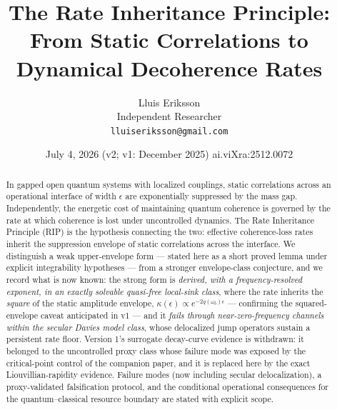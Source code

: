 \documentclass[11pt,a4paper]{article}
\title{The Rate Inheritance Principle:\\
From Static Correlations to Dynamical Decoherence Rates}
\author{Lluis Eriksson\\ \small Independent Researcher\\
\small \texttt{lluiseriksson@gmail.com}}
\date{July 4, 2026 \quad (v2; v1: December 2025) \quad ai.viXra:2512.0072}
\theoremstyle{plain}
\theoremstyle{definition}
\theoremstyle{remark}
\newcommand{\eps}{\epsilon}
\begin{document}
\maketitle

\begin{center}
\end{center}

\begin{abstract}
In gapped open quantum systems with localized couplings, static correlations
across an operational interface of width $\eps$ are exponentially suppressed
by the mass gap. Independently, the energetic cost of maintaining quantum
coherence is governed by the rate at which coherence is lost under
uncontrolled dynamics. The Rate Inheritance Principle (RIP) is the hypothesis
connecting the two: effective coherence-loss rates inherit the suppression
envelope of static correlations across the interface. We distinguish a weak
upper-envelope form --- stated here as a short proved lemma under explicit
integrability hypotheses --- from a stronger envelope-class conjecture, and we
record what is now known: the strong form is \emph{derived, with a
frequency-resolved exponent, in an exactly solvable quasi-free local-sink
class}, where the rate inherits the \emph{square} of the static amplitude
envelope, $\kappa(\eps) \propto e^{-2q(\omega_b)\eps}$ --- confirming the
squared-envelope caveat anticipated in v1 --- and it \emph{fails through
near-zero-frequency channels within the secular Davies model class}, whose
delocalized jump operators sustain a persistent rate floor. Version 1's
surrogate decay-curve evidence is withdrawn: it belonged to the uncontrolled
proxy class whose failure mode was exposed by the critical-point control of
the companion paper, and it is replaced here by the exact Liouvillian-rapidity
evidence. Failure modes (now including secular delocalization), a
proxy-validated falsification protocol, and the conditional operational
consequences for the quantum--classical resource boundary are stated with
explicit scope.
\end{abstract}
\end{document}
